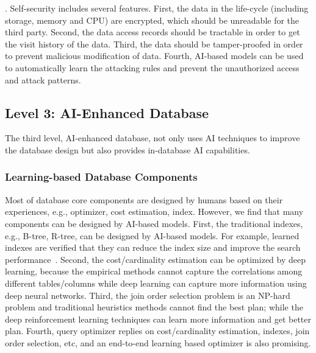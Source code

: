 . Self-security includes several features. First, the data in the life-cycle (including storage, memory and CPU) are encrypted, which should be unreadable for the third party. Second, the data access records should be tractable in order to get the visit history of the data. Third, the data should be tamper-proofed in order to prevent malicious modification of data. Fourth, AI-based models can be used to automatically learn the attacking rules and prevent the unauthorized access and attack patterns.


\subsection{Level 3: AI-Enhanced Database}
\label{subsec: enhanced}

The third level, AI-enhanced database, not only uses AI techniques to improve the database design but also provides in-database AI capabilities. 


\subsubsection{Learning-based Database Components}
\label{subsubsec: intelligent}

Most of database core components are designed by humans based on their experiences, e.g., optimizer, cost estimation, index. However, we find that many components can be designed by AI-based models. First, the traditional indexes, e.g., B-tree, R-tree, can be designed by AI-based models. For example, learned indexes are verified that they can reduce the index size and improve the search performance~\cite{DBLP:conf/sigmod/KraskaBCDP18}. Second, the cost/cardinality estimation can be optimized by deep learning, because the empirical methods cannot capture the correlations among different tables/columns while deep learning can capture more information using deep neural networks. Third, the join order selection problem is an NP-hard problem and traditional heuristics methods cannot find the best plan; while the deep reinforcement learning techniques can learn more information and get better plan. Fourth, query optimizer replies on cost/cardinality estimation, indexes, join order selection, etc, and an end-to-end learning based optimizer is also promising. 

